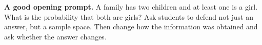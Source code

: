 \begin{checkpoint}
\textbf{A good opening prompt.} A family has two children and at least one is a girl. What is the probability that both are girls? Ask students to defend not just an answer, but a sample space. Then change how the information was obtained and ask whether the answer changes.
\end{checkpoint}
